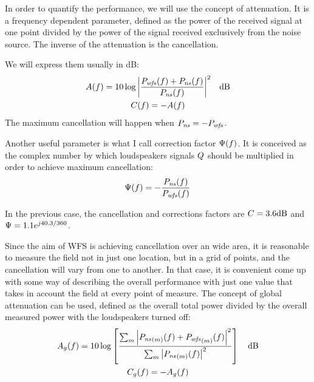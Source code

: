 In order to quantify the performance, we will use the concept of attenuation. It is a frequency dependent parameter, defined as the power of the received signal at one point divided by the power of the signal received exclusively from the noise source. The inverse of the attenuation is the cancellation.

We will express them usually in dB:
\begin{gather}
\attenuation(f) = 10\log{\left\lvert\frac{\Field[wfs][frequency](f) + \Field[ns][frequency](f)}{\Field[ns][frequency](f)}\right\rvert^2}\quad\si{dB}\\
\cancellation(f) = -\attenuation(f)
\end{gather}
The maximum cancellation will happen when $\Field[ns][frequency] = -\Field[wfs][frequency]$.

Another useful parameter is what I call correction factor $\correctionFactor(f)$. It is conceived as the complex number by which loudspeakers signals $\signal[wfs][frequency]$ should be multiplied in order to achieve maximum cancellation:
\begin{equation}
\correctionFactor(f) = -\frac{\Field[ns][frequency](f)}{\Field[wfs][frequency](f)}
\end{equation}

In the previous case, the cancellation and corrections factors are $\cancellation = 3.6\si{dB}$ and $\correctionFactor = 1.1 e^{j40.3/360}$.

Since the aim of WFS is achieving cancellation over an wide area, it is reasonable to measure the field not in just one location, but in a grid of points, and the cancellation will vary from one to another. In that case, it is convenient come up with some way of describing the overall performance with just one value that takes in account the field at every point of measure. The concept of global attenuation can be used, defined as the overall total power divided by the overall measured power with the loudspeakers turned off:
\begin{gather}
\globalAttenuation(f) = 10 \log \left[\frac{\sum_m \abs{\Field[ns][frequency][scalar][m](f) + \Field[wfs][frequency][scalar][m](f)}^2}{\sum_m \abs{\Field[ns][frequency][scalar][m](f)}^2}\right] \quad \si{dB}
\\
\globalCancellation(f) = -\globalAttenuation(f)
\end{gather}

